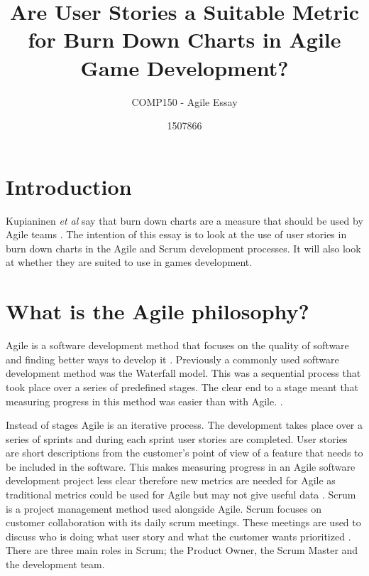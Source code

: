\documentclass{scrartcl}
\title{Are User Stories a Suitable Metric for Burn Down Charts in Agile Game Development?}
\subtitle{COMP150 - Agile Essay}
\author{1507866}
\begin{document}
	
\maketitle
	
	
\section{Introduction}

Kupianinen \textit{et al} say that burn down charts are a measure that should be used by Agile teams \cite{Kupiainen}. The intention of this essay is to look at the use of user stories in burn down charts in the Agile and Scrum development processes. It will also look at whether they are suited to use in games development.

\section{What is the Agile philosophy?}

Agile is a software development method that focuses on the quality of software and finding better ways to develop it \cite{AgileManifesto}. Previously a commonly used software development method was the Waterfall model. This was a sequential process that took place over a series of predefined stages. The clear end to a stage meant that measuring progress in this method was easier than with Agile. \cite{Duka}.

Instead of stages Agile is an iterative process. The development takes place over a series of sprints and during each sprint user stories are completed. User stories are short descriptions from the customer's point of view of a feature that needs to be included in the software. This makes measuring progress in an Agile software development project less clear therefore new metrics are needed for Agile as traditional metrics could be used for Agile but may not give useful data \cite{Misra}.
Scrum is a project management method used alongside Agile. Scrum focuses on customer collaboration with its daily scrum meetings. These meetings are used to discuss who is doing what user story and what the customer wants prioritized \cite{Sutherland}.
There are three main roles in Scrum; the Product Owner, the Scrum Master and the development team. \cite{Ktata}
\end{document}
